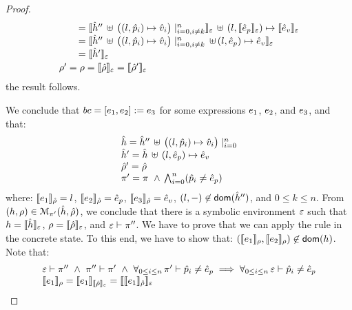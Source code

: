 \begin{proof}
$$\begin{array}{l}
  \qquad = \llbracket \hat{h}'' \, \uplus \, \big((l, \hat{p}_i) \mapsto \hat{v}_i\big)\mid_{i = 0, i \neq k}^n \rrbracket_{\varepsilon} \, \uplus \, (l, \llbracket \hat{e}_p \rrbracket_{\varepsilon}) \mapsto \llbracket \hat{e}_v \rrbracket_{\varepsilon}  \\
    \qquad = \llbracket \hat{h}'' \, \uplus \, \big((l, \hat{p}_i) \mapsto \hat{v}_i\big)\mid_{i = 0, i \neq k}^n \, \uplus \, (l, \hat{e}_p) \mapsto \hat{e}_v \rrbracket_{\varepsilon}  \\
    \qquad = \llbracket \hat{h}' \rrbracket_{\varepsilon} \\[2pt]
 \rho' = \rho = \llbracket \hat\rho \rrbracket_{\varepsilon} = \llbracket \hat\rho' \rrbracket_{\varepsilon} 
\end{array}
$$
the result follows. 
\vspace{6pt}

\noindent{}
We conclude that  $\bcmd = [\jsilexpr_1, \jsilexpr_2] := \jsilexpr_3$ for some expressions $\jsilexpr_1$, $\jsilexpr_2$, 
and $\jsilexpr_3$, and that: 
$$
\begin{array}{l}
  \sheap =   \sheap'' \, \uplus \, \big((l, \sexprp_i) \mapsto \sexprv_i\big)\mid_{i = 0}^n     \\
  \sheap' =  \sheap \, \uplus \,  (l, \sexpr_p) \mapsto \sexpr_v  \\
  \sstore' = \sstore \\ 
    \pc' = \pc \ \wedge \, \bigwedge_{i = 0}^n (\sexprp_i \neq \sexpr_p)
\end{array}
$$ 
where: $\symbeval{\jsilexpr_1}{\sstore} =  \loc$, $\symbeval{\jsilexpr_2}{\sstore} =  \sexpr_p$, 
$\symbeval{\jsilexpr_3}{\sstore} =  \sexpr_v$,  $(\loc, -) \not\in \domain(\sheap'')$, 
and $0 \leq k \leq n$. 
From $(\heap, \store) \in \smodels{\sheap, \sstore}{\pc'}$, we conclude that there is a symbolic environment
$\senv$ such that $\heap = \semexpr{\sheap}{\senv}$, $\store = \semexpr{\sstore}{\senv}$, and 
$\senv \vdash \pc''$. 
We have to prove that we can apply the  rule in the concrete state.
To this end, we have to show that:
$(\symbeval{\jsilexpr_1}{\store}, \symbeval{\jsilexpr_2}{\store}) \not\in \domain(\heap)$. 
Note that: 
$$
\begin{array}{l}
%
\senv \vdash \pc'' \ \wedge \ \pc'' \vdash \pc' \ \wedge \ \forall_{0 \leq i \leq n}  \, \pc' \vdash \sexprp_i \neq \sexpr_p  
      \implies \forall_{0 \leq i \leq n}  \, \senv \vdash \sexprp_i \neq \sexpr_p  \\
%
 \symbeval{\jsilexpr_1}{\store} = \symbeval{\jsilexpr_1}{\symbeval{\sstore}{\senv}} = \symbeval{\symbeval{\jsilexpr_1}{\sstore}}{\senv} 

\end{array}$$
\end{proof}
